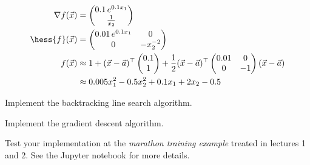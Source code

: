 \begin{solution}[print=true]

\begin{align*}
\nabla f(\vec x) &= \begin{pmatrix}
0.1\, e^{0.1 x_1}\\
\frac{1}{x_2}
\end{pmatrix}
\\
\hess{f}(\vec x) &= \begin{pmatrix}
0.01\, e^{0.1 x_1} & 0\\
0 & -x_2^{-2}
\end{pmatrix}\\
f(\vec x) &\approx  1 + (\vec x-\vec a)^\top \begin{pmatrix}
0.1 \\ 1
\end{pmatrix}
+ \frac{1}{2}(\vec x- \vec a)^\top \begin{pmatrix}
0.01 & 0\\
0 & -1
\end{pmatrix}
(\vec x-\vec a)\\
&\approx  0.005 x_1^2 - 0.5 x_2^2 + 0.1 x_1 + 2 x_2 - 0.5
\end{align*}
\end{solution}




\begin{exercise}[subtitle = {Notebook}]
  Implement the backtracking line search algorithm.
\end{exercise}

\begin{exercise}[subtitle = {Notebook}]
Implement the gradient descent algorithm.
\end{exercise}

\begin{exercise}[subtitle = {Notebook}]
Test your implementation at the \textit{marathon training example} treated in lectures 1 and 2. See the Jupyter notebook for more details.
\end{exercise}



